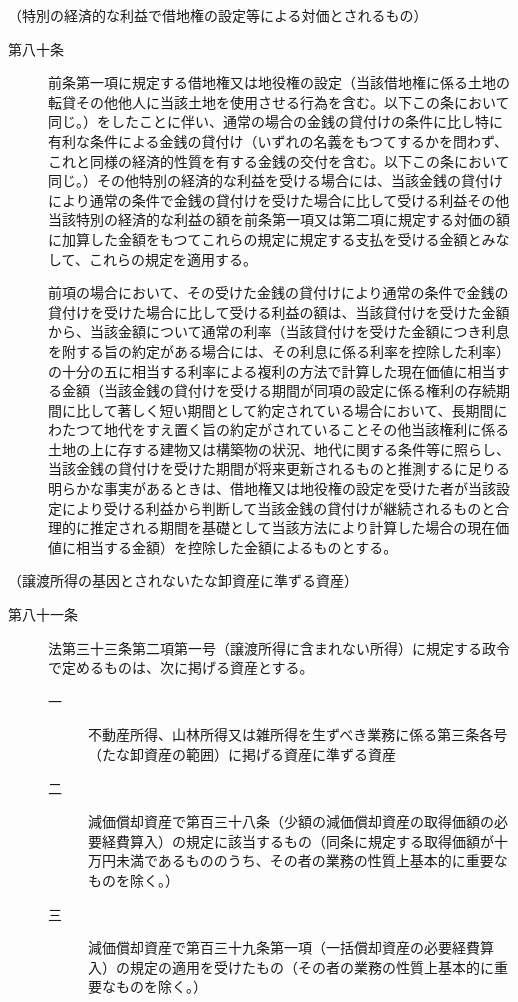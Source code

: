 \documentclass[twocolumn,a4j,10pt]{ltjtarticle}
\begin{document}
\noindent\hspace{10pt}（特別の経済的な利益で借地権の設定等による対価とされるもの）
\begin{description}
\item[第八十条]前条第一項に規定する借地権又は地役権の設定（当該借地権に係る土地の転貸その他他人に当該土地を使用させる行為を含む。以下この条において同じ。）をしたことに伴い、通常の場合の金銭の貸付けの条件に比し特に有利な条件による金銭の貸付け（いずれの名義をもつてするかを問わず、これと同様の経済的性質を有する金銭の交付を含む。以下この条において同じ。）その他特別の経済的な利益を受ける場合には、当該金銭の貸付けにより通常の条件で金銭の貸付けを受けた場合に比して受ける利益その他当該特別の経済的な利益の額を前条第一項又は第二項に規定する対価の額に加算した金額をもつてこれらの規定に規定する支払を受ける金額とみなして、これらの規定を適用する。
\item[]前項の場合において、その受けた金銭の貸付けにより通常の条件で金銭の貸付けを受けた場合に比して受ける利益の額は、当該貸付けを受けた金額から、当該金額について通常の利率（当該貸付けを受けた金額につき利息を附する旨の約定がある場合には、その利息に係る利率を控除した利率）の十分の五に相当する利率による複利の方法で計算した現在価値に相当する金額（当該金銭の貸付けを受ける期間が同項の設定に係る権利の存続期間に比して著しく短い期間として約定されている場合において、長期間にわたつて地代をすえ置く旨の約定がされていることその他当該権利に係る土地の上に存する建物又は構築物の状況、地代に関する条件等に照らし、当該金銭の貸付けを受けた期間が将来更新されるものと推測するに足りる明らかな事実があるときは、借地権又は地役権の設定を受けた者が当該設定により受ける利益から判断して当該金銭の貸付けが継続されるものと合理的に推定される期間を基礎として当該方法により計算した場合の現在価値に相当する金額）を控除した金額によるものとする。
\end{description}
\noindent\hspace{10pt}（譲渡所得の基因とされないたな卸資産に準ずる資産）
\begin{description}
\item[第八十一条]法第三十三条第二項第一号（譲渡所得に含まれない所得）に規定する政令で定めるものは、次に掲げる資産とする。
\begin{description}
\item[一]不動産所得、山林所得又は雑所得を生ずべき業務に係る第三条各号（たな卸資産の範囲）に掲げる資産に準ずる資産
\item[二]減価償却資産で第百三十八条（少額の減価償却資産の取得価額の必要経費算入）の規定に該当するもの（同条に規定する取得価額が十万円未満であるもののうち、その者の業務の性質上基本的に重要なものを除く。）
\item[三]減価償却資産で第百三十九条第一項（一括償却資産の必要経費算入）の規定の適用を受けたもの（その者の業務の性質上基本的に重要なものを除く。）
\end{description}
\end{description}
\end{document}
